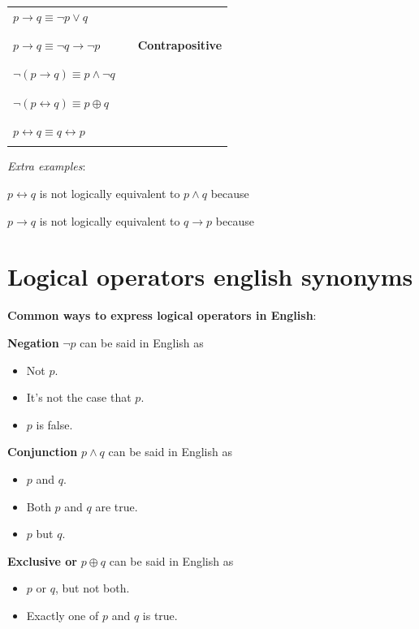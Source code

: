 \documentclass[12pt, oneside]{article}
\begin{document}
\begin{tabular}{llp{3in}}
$p \to q \equiv \lnot p \lor q$ & & \\
&& \\
&& \\
$p \to q \equiv \lnot q \to \lnot p$ & &{\bf Contrapositive} \\
&& \\
&& \\
$\lnot (p \to q) \equiv p\land \lnot q$  & &\\
&& \\
&& \\
$\lnot( p \leftrightarrow q) \equiv p \oplus q$ && \\
&& \\
&& \\
$p \leftrightarrow q \equiv q \leftrightarrow p$ &&\\
&& \\
\end{tabular}

{\it Extra examples}:

$p \leftrightarrow q$ is not logically equivalent to $p \land q$ because \underline{\phantom{\hspace{4in}}} 

$p \to q$ is not logically equivalent to $q \to p$ because \underline{\phantom{\hspace{4in}}} 
 \vfill
\section*{Logical operators english synonyms}


{\bf Common ways to express logical operators in English}:

{\bf Negation} $\lnot p$ can be said in English as 
\begin{itemize}
\item Not $p$.
\item It's not the case that $p$.
\item $p$ is false.
\end{itemize}

{\bf Conjunction} $p \land q$ can be said in English as
\begin{itemize}
    \item $p$ and $q$.
    \item Both $p$ and $q$ are true.
    \item $p$ but $q$.
\end{itemize}

{\bf Exclusive or} $p \oplus q$ can be said in English as
\begin{itemize}
    \item $p$ or $q$, but not both.
    \item Exactly one of $p$ and $q$ is true.
\end{itemize}
\end{document}

